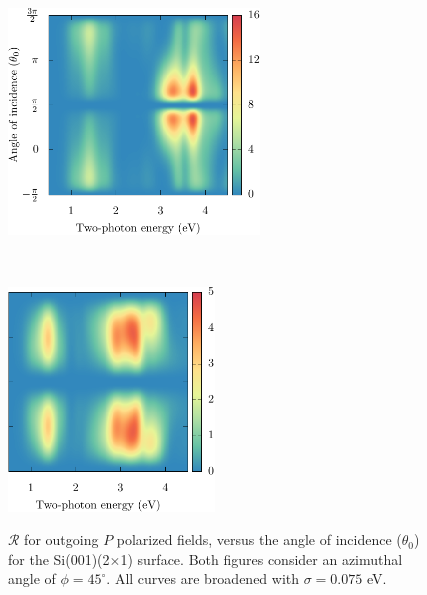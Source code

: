 \documentclass[11pt]{book}
\begin{document}
\begin{figure}
    \begin{minipage}[b]{0.5\textwidth}
        \centering
        \includegraphics[height=6cm]{../figures/04-results/fig-4_2_01}
        \label{fig:2x1rpp3d}
    \end{minipage}
    ~
    \begin{minipage}[b]{0.5\textwidth}
        \centering
        \includegraphics[height=5.945cm]{../figures/04-results/fig-4_2_02}
        \label{fig:2x1rsp3d}
    \end{minipage}
    \caption{$\mathcal{R}$ for outgoing $P$ polarized fields, versus the angle
    of incidence ($\theta_{0}$) for the Si(001)(2$\times$1) surface. Both
    figures consider an azimuthal angle of $\phi = 45^{\circ}$. All curves are
    broadened with $\sigma = 0.075$ eV.}
    \label{fig:2x1rP3d}
\end{figure}
\end{document}
